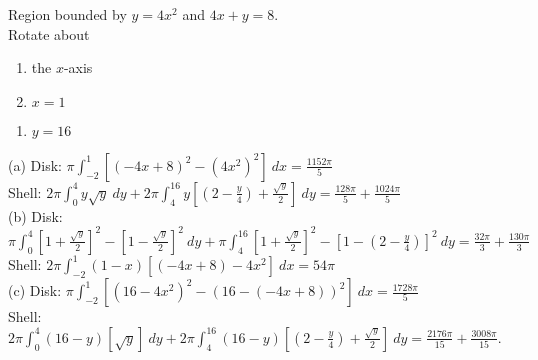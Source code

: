 {Region bounded by $y=4x^2$ and $4x+y=8$.\\
Rotate about\\
\begin{minipage}[t]{.5\linewidth}
 \begin{enumerate}
  \item the $x$-axis
  \item $x=1$
 \end{enumerate}
\end{minipage}%
\begin{minipage}[t]{.5\linewidth}
 \begin{enumerate}\addtocounter{enumii}{2}
  \item $y=16$
 \end{enumerate}
\end{minipage}}
{\noindent
(a) Disk: $\pi \int_{-2}^1\left[(-4x+8)^2-(4x^2)^2\right]\ dx=\frac{1152\pi}{5}$\\
Shell: $2\pi \int_0^4 y\sqrt y\ dy+2\pi \int_4^{16}y\left[\left(2-\frac y4\right)+\frac{\sqrt y}2\right]\ dy=\frac{128\pi}5+\frac{1024\pi}5$\\
(b) Disk:
$\pi \int_0^4\left[1+\frac{\sqrt y}2\right]^2-\left[1-\frac{\sqrt y}2\right]^2\ dy
+\pi \int_4^{16}\left[1+\frac{\sqrt y}2\right]^2-\left[1-\left(2-\frac y4\right)\right]^2\ dy
=\frac{32\pi}{3}+\frac{130\pi}3$\\
Shell: $2\pi \int_{-2}^1 (1-x)\left[(-4x+8)-4x^2\right]\ dx=54\pi$\\
(c) Disk: $\pi \int_{-2}^1\left[(16-4x^2)^2-(16-(-4x+8))^2\right]\ dx=\frac{1728\pi}{5}$\\
Shell: $2\pi \int_0^4 (16-y)\left[\sqrt y\right]\ dy
+2\pi \int_4^{16} (16-y)\left[\left(2-\frac y4\right)+\frac{\sqrt y}2\right]\ dy
=\frac{2176\pi}{15}+\frac{3008\pi}{15}$.}
